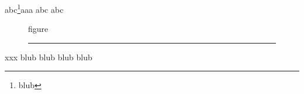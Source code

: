 \documentclass[12pt,a4paper]{article}
\begin{document}
abc\tagmcend\footnote{blub\tagmcend}aaa
\newpage
abc
\tagmcend
{}
abc
\tagmcend
\begin{figure}[b]
figure \rule{1cm}{0.2\textwidth}
\tagmcend
\end{figure}
xxx
\newpage
blub
\newpage
blub
\tagmcend
\newpage
{}blub
\tagmcend
{}blub
\tagmcend
\end{document}
